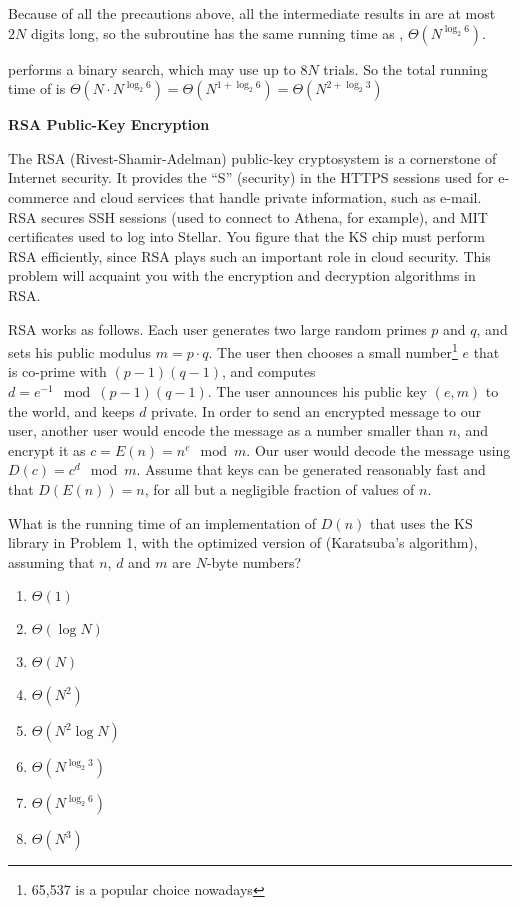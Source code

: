 \documentclass[12pt,twoside]{article}
\begin{document}
\begin{problems}
\begin{problemparts}
{  Because of all the precautions above, all the intermediate results in
   are at most $2N$ digits long, so the subroutine has the same
  running time as , $\Theta(N^{\log_2 6})$.
  
   performs a binary search, which may use up to $8N$ trials. So
  the total running time of  is $\Theta(N \cdot N^{\log_2 6}) =
  \Theta(N^{1 + \log_2 6}) = \Theta(N^{2 + \log_2 3})$
}
\end{problemparts}

\newpage

\problem {} \textbf{RSA Public-Key Encryption}

The RSA (Rivest-Shamir-Adelman) public-key cryptosystem is a cornerstone of
Internet security. It provides the ``S'' (security) in the HTTPS sessions used
for e-commerce and cloud services that handle private information, such as
e-mail. RSA secures SSH sessions (used to connect to Athena, for example), and
MIT certificates used to log into Stellar. You figure that the KS chip must
perform RSA efficiently, since RSA plays such an important role in cloud
security. This problem will acquaint you with the encryption and decryption
algorithms in RSA.

RSA works as follows. Each user generates two large random primes $p$ and $q$,
and sets his public modulus $m = p \cdot q$. The user then chooses a small
number\footnote{65,537 is a popular choice nowadays} $e$ that is co-prime with
$(p - 1)(q - 1)$, and computes $d = e^{-1} \mod (p - 1)(q - 1)$. The user
announces his public key $(e, m)$ to the world, and keeps $d$ private. In order
to send an encrypted message to our user, another user would encode the message
as a number smaller than $n$, and encrypt it as $c = E(n) = n^e \mod m$. Our
user would decode the message using $D(c) = c^d \mod m$. Assume that keys can be
generated reasonably fast and that $D(E(n)) = n$, for all but a negligible
fraction of values of $n$.

\begin{problemparts}
\problempart {} What is the running time of an implementation of $D(n)$
that uses the KS library in Problem 1, with the optimized version of
 (Karatsuba's algorithm), assuming that $n$, $d$ and $m$ are
$N$-byte numbers?
\begin{enumerate}
  \item $\Theta(1)$
  \item $\Theta(\log N)$
  \item $\Theta(N)$
  \item $\Theta(N^2)$
  \item $\Theta(N^2 \log N)$
  \item $\Theta(N^{\log_2 3})$
  \item $\Theta(N^{\log_2 6})$
  \item $\Theta(N^3)$
\end{enumerate}
\end{problemparts}


\end{problems}
\end{document}
